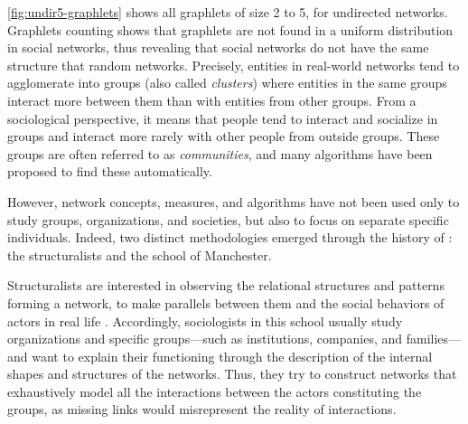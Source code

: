 \autoref{fig:undir5-graphlets} shows all graphlets of size 2 to 5, for undirected networks.
Graphlets counting shows that graphlets are not found in a uniform distribution in social networks\cite{charbeyStarsHolesPaths2019}, thus revealing that social networks do not have the same structure that random networks.
Precisely, entities in real-world networks tend to agglomerate into groups (also called \emph{clusters}) where entities in the same groups interact more between them than with entities from other groups\cite{girvanCommunityStructureSocial2002}.
From a sociological perspective, it means that people tend to interact and socialize in groups and interact more rarely with other people from outside groups.
These groups are often referred to as \emph{communities}, and many algorithms have been proposed to find these automatically\cite{fortunatoCommunityDetectionGraphs2010}.

However, network concepts, measures, and algorithms have not been used only to study groups, organizations, and societies, but also to focus on separate specific individuals.
Indeed, two distinct methodologies emerged through the history of \sna: the structuralists and the school of Manchester\cite{eveDeuxTraditionsAnalyse2002, maurizio2000, freemanDevelopmentSocialNetwork2004}.

Structuralists are interested in observing the relational structures and patterns forming a network, to make parallels between them and the social behaviors of actors in real life \cite{lazegaReseaux}.
Accordingly, sociologists in this school usually study organizations and specific groups---such as institutions, companies, and families---and want to explain their functioning through the description of the internal shapes and structures of the networks.
Thus, they try to construct networks that exhaustively model all the interactions between the actors constituting the groups, as missing links would misrepresent the reality of interactions.

